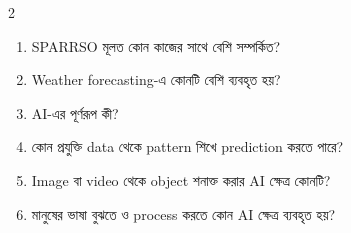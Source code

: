 \begin{practicebox}
\begin{multicols}{2}
\begin{enumerate}
\item \begin{minipage}[t]{\linewidth}SPARRSO মূলত কোন কাজের সাথে বেশি সম্পর্কিত?\par {}\par\end{minipage}

\item \begin{minipage}[t]{\linewidth}Weather forecasting-এ কোনটি বেশি ব্যবহৃত হয়?\par {}\par\end{minipage}

\item \begin{minipage}[t]{\linewidth}AI-এর পূর্ণরূপ কী?\par {}\par\end{minipage}

\item \begin{minipage}[t]{\linewidth}কোন প্রযুক্তি data থেকে pattern শিখে prediction করতে পারে?\par {}\par\end{minipage}

\item \begin{minipage}[t]{\linewidth}Image বা video থেকে object শনাক্ত করার AI ক্ষেত্র কোনটি?\par {}\par\end{minipage}

\item \begin{minipage}[t]{\linewidth}মানুষের ভাষা বুঝতে ও process করতে কোন AI ক্ষেত্র ব্যবহৃত হয়?\par {}\par\end{minipage}


\end{enumerate}
\end{multicols}
\end{practicebox}
